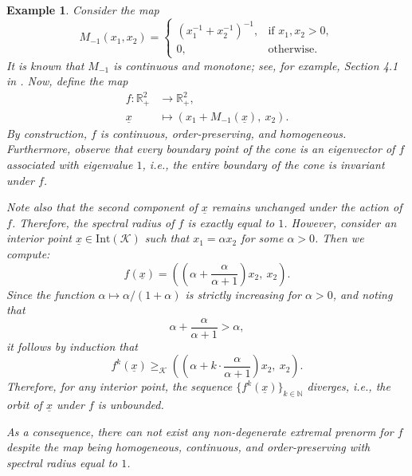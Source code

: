 \documentclass{article}
\newtheorem{example}[theorem]{Example}
\newcommand{\cone}{\mathcal{K}}
\newcommand{\interior}{\mathrm{Int}}
\newcommand{\cgeq}{\geq_{\cone}}
\begin{document}
\begin{example}\label{ex:not_existence_of_continuous_extr_prenorm}
    Consider the map
    \begin{equation}
        M_{-1}(x_1, x_2) =
        \begin{cases}
            \left(x_1^{-1} + x_2^{-1}\right)^{-1}, & \text{if } x_1, x_2 > 0, \\
            0, & \text{otherwise}.
        \end{cases}
    \end{equation}
    It is known that $M_{-1}$ is continuous and monotone; see, for example, Section 4.1 in \cite{lemmens2012nonlinear}. Now, define the map
    \begin{equation}
        \begin{aligned}
            f: \mathbb{R}^2_+ &\longrightarrow \mathbb{R}^2_+, \\
            \underline{x} &\mapsto \left(x_1 + M_{-1}(\underline{x}),\ x_2\right).
        \end{aligned}
    \end{equation}
    By construction, $f$ is continuous, order-preserving, and homogeneous. Furthermore, observe that every boundary point of the cone is an eigenvector of $f$ associated with eigenvalue $1$, i.e., the entire boundary of the cone is invariant under $f$.

    Note also that the second component of $\underline{x}$ remains unchanged under the action of $f$. Therefore, the spectral radius of $f$ is exactly equal to $1$. However, consider an interior point $\underline{x} \in \interior(\cone)$ such that $x_1 = \alpha x_2$ for some $\alpha > 0$. Then we compute:
    \begin{equation}
        f(\underline{x}) = \left( \left( \alpha + \frac{\alpha}{\alpha + 1} \right) x_2,\ x_2 \right).
    \end{equation}
    Since the function $\alpha \mapsto \alpha/(1 + \alpha)$ is strictly increasing for $\alpha > 0$, and noting that
    \[
        \alpha + \frac{\alpha}{\alpha + 1} > \alpha,
    \]
    it follows by induction that
    \begin{equation}
        f^k(\underline{x}) \cgeq \left( \left( \alpha + k \cdot \frac{\alpha}{\alpha + 1} \right) x_2,\ x_2 \right).
    \end{equation}
    Therefore, for any interior point, the sequence $\{f^k(\underline{x})\}_{k \in \mathbb{N}}$ diverges, i.e., the orbit of $\underline{x}$ under $f$ is unbounded.

    As a consequence, there can not exist any non-degenerate extremal prenorm for $f$ despite the map being homogeneous, continuous, and order-preserving with spectral radius equal to $1$.
\end{example}
\end{document}
